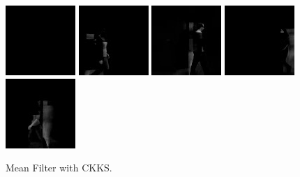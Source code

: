 \begin{subfigure}[t]{0.9\textwidth}
    \centering
    \includegraphics[scale=0.7]{figures/LASIESTA-CKKS-MEAN/frame0}
    \hfill
    \includegraphics[scale=0.7]{figures/LASIESTA-CKKS-MEAN/frame100}
    \hfill
    \includegraphics[scale=0.7]{figures/LASIESTA-CKKS-MEAN/frame190}
    \hfill
    \includegraphics[scale=0.7]{figures/LASIESTA-CKKS-MEAN/frame250}
    \hfill
    \includegraphics[scale=0.7]{figures/LASIESTA-CKKS-MEAN/frame270}
    \caption{Mean Filter with CKKS.}
\end{subfigure}%
\\ \bigskip
